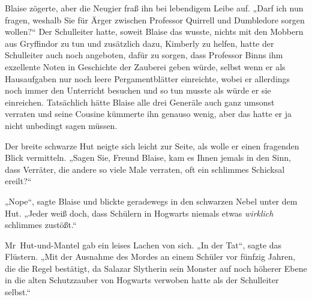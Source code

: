 Blaise zögerte, aber die Neugier fraß ihn bei lebendigem Leibe auf. „Darf ich nun fragen, weshalb Sie für Ärger zwischen Professor Quirrell und Dumbledore sorgen wollen?“ Der Schulleiter hatte, soweit Blaise das wusste, nichts mit den Mobbern aus Gryffindor zu tun und zusätzlich dazu, Kimberly zu helfen, hatte der Schulleiter auch noch angeboten, dafür zu sorgen, dass Professor Binns ihm exzellente Noten in Geschichte der Zauberei geben würde, selbst wenn er als Hausaufgaben nur noch leere Pergamentblätter einreichte, wobei er allerdings noch immer den Unterricht besuchen und so tun musste als würde er sie einreichen. Tatsächlich hätte Blaise alle drei Generäle auch ganz umsonst verraten und seine Cousine kümmerte ihn genauso wenig, aber das hatte er ja nicht unbedingt sagen müssen.

Der breite schwarze Hut neigte sich leicht zur Seite, als wolle er einen fragenden Blick vermitteln. „Sagen Sie, Freund Blaise, kam es Ihnen jemals in den Sinn, dass Verräter, die andere so viele Male verraten, oft ein schlimmes Schicksal ereilt?“

„Nope“, sagte Blaise und blickte geradewegs in den schwarzen Nebel unter dem Hut. „Jeder weiß doch, dass Schülern in Hogwarts niemals etwas \emph{wirklich} schlimmes zustößt.“

Mr~Hut-und-Mantel gab ein leises Lachen von sich. „In der Tat“, sagte das Flüstern. „Mit der Ausnahme des Mordes an einem Schüler vor fünfzig Jahren, die die Regel bestätigt, da Salazar Slytherin sein Monster auf noch höherer Ebene in die alten Schutzzauber von Hogwarts verwoben hatte als der Schulleiter selbst.“

